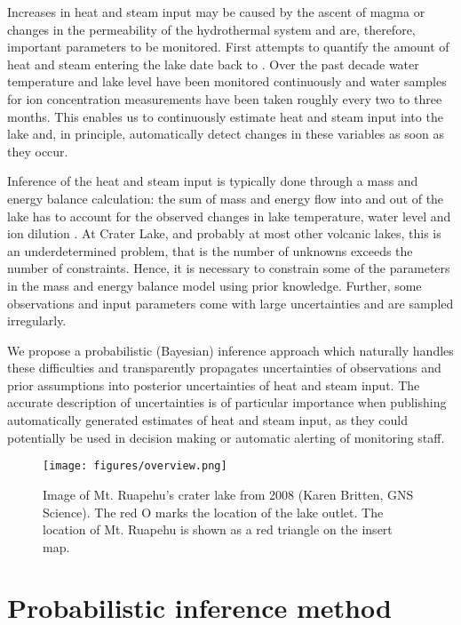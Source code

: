 \documentclass{bmc_template/bmcart}
\begin{document}
Increases in heat and steam input may be caused by the ascent of magma or
changes in the permeability of the hydrothermal system and are, therefore,
important parameters to be monitored. First attempts to quantify the amount of
heat and steam entering the lake date back to \citep{Dibble1966}. Over the past
decade water temperature and lake level have been monitored continuously
and water samples for ion concentration measurements have been taken roughly
every two to three months. This enables us to continuously estimate heat and
steam input into the lake and, in principle, automatically detect changes in
these variables as soon as they occur.

Inference of the heat and steam input is typically done through a mass and
energy balance calculation: the sum of mass and energy flow into and out of the
lake has to account for the observed changes in lake temperature, water level
and ion dilution \citep[e.g.,][]{Hurst1981, Hurst1991, Stevenson1992,
Fournier2009, Scott1994}. At Crater Lake, and probably at most other volcanic
lakes, this is an underdetermined problem, that is the number of unknowns
exceeds the number of constraints. Hence, it is necessary to constrain some of
the parameters in the mass and energy balance model using prior knowledge. Further,
some observations and input parameters come with large uncertainties and are sampled
irregularly.

We propose a probabilistic (Bayesian) inference approach which naturally
handles these difficulties and transparently propagates uncertainties of
observations and prior assumptions into posterior uncertainties of heat and
steam input. The accurate description of uncertainties is of particular
importance when publishing automatically generated estimates of heat and steam
input, as they could potentially be used in decision making or automatic
alerting of monitoring staff.

\begin{figure}
\texttt{[image: figures/overview.png]}  
\caption{Image of Mt. Ruapehu's crater lake from 2008 (\textcopyright Karen
	Britten, GNS Science). The red O marks the location of the lake outlet. The
	location of Mt. Ruapehu is shown as a red triangle on the insert map.}
  \label{overview}
\end{figure}


\section*{Probabilistic inference method}\label{Pim}
\end{document}
